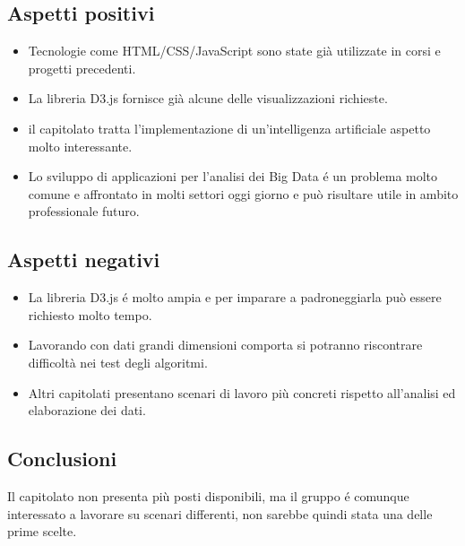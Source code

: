 \subsection{Aspetti positivi}
\begin{itemize}
\item Tecnologie come HTML/CSS/JavaScript sono state già utilizzate in corsi e progetti precedenti.
\item La libreria D3.js fornisce già alcune delle visualizzazioni richieste.
\item il capitolato tratta l'implementazione di un'intelligenza artificiale aspetto molto interessante.
\item Lo sviluppo di applicazioni per l'analisi dei Big Data é un problema molto comune e affrontato in molti settori oggi giorno e può risultare utile in ambito professionale futuro.
\end{itemize}

\subsection{Aspetti negativi}
\begin{itemize}
\item La libreria D3.js é molto ampia e per imparare a padroneggiarla può essere richiesto molto tempo.
\item Lavorando con dati grandi dimensioni comporta si potranno riscontrare difficoltà nei test degli algoritmi.
\item Altri capitolati presentano scenari di lavoro più concreti rispetto all'analisi ed elaborazione dei dati.
\end{itemize}


\subsection{Conclusioni}
Il capitolato non presenta più posti disponibili, ma il gruppo é comunque interessato a lavorare su scenari differenti, non sarebbe quindi stata una delle prime scelte.